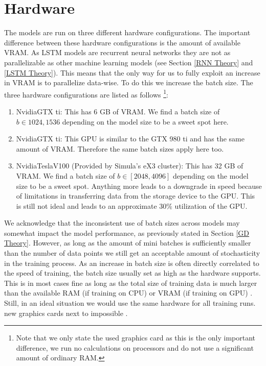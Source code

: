 \section{Hardware}
The models are run on three different hardware configurations. The important difference 
between these hardware configurations is the amount of available VRAM. As LSTM models 
are recurrent neural networks they are not as parallelizable as other machine learning 
models (see Section \ref{RNN Theory} and \ref{LSTM Theory}). This means that the only way for us to fully exploit 
an increase in VRAM is to parallelize data-wise. To do this we increase the batch size.
The three hardware configurations are listed as follows \footnote{Note that we only 
state the used graphics card as this is the only important difference, we run no 
calculations on processors and do not use a significant amount of ordinary RAM.}:
\begin{enumerate}
    \item Nvidia\textregistered  GTX ti: This has 6 GB of VRAM. We find a batch size of $b\in{1024, 1536}$ 
     depending on the model size to be a sweet spot here.
    \item Nvidia\textregistered   GTX ti: This GPU is similar to the GTX 980 ti and has the 
        same amount of VRAM. Therefore the same batch sizes apply here too.
    \item Nvidia\textregistered   Tesla\texttrademark  V100 (Provided by Simula's eX3 cluster): This has 32 GB of VRAM. 
        We find a batch size of $b\in[2048,4096]$ depending on the model size
        to be a sweet spot. Anything more leads to a downgrade in speed because 
        of limitations in transferring data from the storage device to the GPU. 
        This is still not ideal and leads to an approximate 30\% utilization of the 
        GPU.
\end{enumerate}
We acknowledge that the inconsistent use of batch sizes across models may somewhat 
impact the model performance, as previously stated in Section \ref{GD Theory}.
However, as long as the amount of mini batches is sufficiently smaller than the number of data points we 
still get an acceptable amount of stochasticity in the training process. As an increase 
in batch size is often directly correlated to the speed of training, the batch size usually set as high as the hardware supports. This is in most cases fine as long 
as the total size of training data is much larger than the available RAM (if training on CPU) or VRAM (if training on GPU) \citationneeded.
Still, in an ideal situation we would use the same hardware for all training runs.
new graphics cards next to impossible \citep{GPUShortage}.
